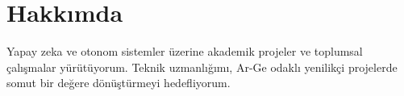 \section{Hakkımda}

Yapay zeka ve otonom sistemler üzerine akademik projeler ve toplumsal çalışmalar yürütüyorum.
Teknik uzmanlığımı, Ar-Ge odaklı yenilikçi projelerde somut bir değere dönüştürmeyi hedefliyorum.
